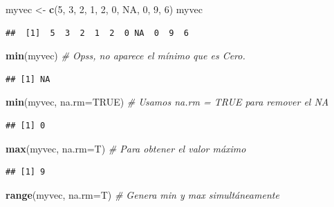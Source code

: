 \documentclass[10pt,]{krantz}
\makeatletter
\newenvironment{Shaded}{\begin{snugshade}}{\end{snugshade}}
\newcommand{\KeywordTok}[1]{\textcolor[rgb]{0.13,0.29,0.53}{\textbf{#1}}}
\newcommand{\DataTypeTok}[1]{\textcolor[rgb]{0.13,0.29,0.53}{#1}}
\newcommand{\DecValTok}[1]{\textcolor[rgb]{0.00,0.00,0.81}{#1}}
\newcommand{\StringTok}[1]{\textcolor[rgb]{0.31,0.60,0.02}{#1}}
\newcommand{\CommentTok}[1]{\textcolor[rgb]{0.56,0.35,0.01}{\textit{#1}}}
\newcommand{\OtherTok}[1]{\textcolor[rgb]{0.56,0.35,0.01}{#1}}
\newcommand{\NormalTok}[1]{#1}
\newenvironment{kframe}{%
\medskip{}
\setlength{\fboxsep}{.8em}
 \def\at@end@of@kframe{}%
 \ifinner\ifhmode%
  \def\at@end@of@kframe{\end{minipage}}%
  \begin{minipage}{\columnwidth}%
 \fi\fi%
 \def\FrameCommand##1{\hskip\@totalleftmargin \hskip-\fboxsep
 \colorbox{shadecolor}{##1}\hskip-\fboxsep
     \hskip-\linewidth \hskip-\@totalleftmargin \hskip\columnwidth}%
 \MakeFramed {\advance\hsize-\width
   \@totalleftmargin\z@ \linewidth\hsize
   \@setminipage}}%
 {\par\unskip\endMakeFramed%
 \at@end@of@kframe}
\renewenvironment{Shaded}{\begin{kframe}}{\end{kframe}}
\makeatother
\begin{document}
\begin{Shaded}
\begin{Highlighting}[]
\NormalTok{myvec <-}\StringTok{ }\KeywordTok{c}\NormalTok{(}\DecValTok{5}\NormalTok{, }\DecValTok{3}\NormalTok{, }\DecValTok{2}\NormalTok{, }\DecValTok{1}\NormalTok{, }\DecValTok{2}\NormalTok{, }\DecValTok{0}\NormalTok{, }\OtherTok{NA}\NormalTok{, }\DecValTok{0}\NormalTok{, }\DecValTok{9}\NormalTok{, }\DecValTok{6}\NormalTok{)}
\NormalTok{myvec}
\end{Highlighting}
\end{Shaded}

\begin{verbatim}
##  [1]  5  3  2  1  2  0 NA  0  9  6
\end{verbatim}

\begin{Shaded}
\begin{Highlighting}[]
\KeywordTok{min}\NormalTok{(myvec)  }\CommentTok{# Opss, no aparece el mínimo que es Cero.}
\end{Highlighting}
\end{Shaded}

\begin{verbatim}
## [1] NA
\end{verbatim}

\begin{Shaded}
\begin{Highlighting}[]
\KeywordTok{min}\NormalTok{(myvec, }\DataTypeTok{na.rm=}\OtherTok{TRUE}\NormalTok{)  }\CommentTok{# Usamos na.rm = TRUE para remover el NA}
\end{Highlighting}
\end{Shaded}

\begin{verbatim}
## [1] 0
\end{verbatim}

\begin{Shaded}
\begin{Highlighting}[]
\KeywordTok{max}\NormalTok{(myvec, }\DataTypeTok{na.rm=}\NormalTok{T)  }\CommentTok{# Para obtener el valor máximo}
\end{Highlighting}
\end{Shaded}

\begin{verbatim}
## [1] 9
\end{verbatim}

\begin{Shaded}
\begin{Highlighting}[]
\KeywordTok{range}\NormalTok{(myvec, }\DataTypeTok{na.rm=}\NormalTok{T)  }\CommentTok{# Genera min y max simultáneamente}
\end{Highlighting}
\end{Shaded}
\end{document}
